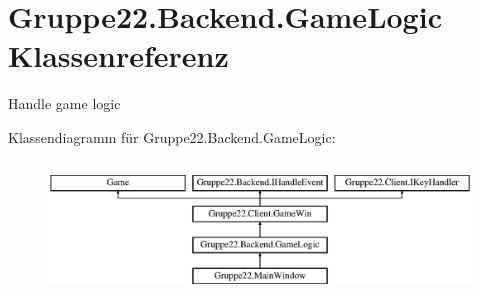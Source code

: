 \hypertarget{class_gruppe22_1_1_backend_1_1_game_logic}{\section{Gruppe22.\-Backend.\-Game\-Logic Klassenreferenz}
\label{class_gruppe22_1_1_backend_1_1_game_logic}
}


Handle game logic  


Klassendiagramm für Gruppe22.\-Backend.\-Game\-Logic\-:\begin{figure}[H]
\begin{center}
\leavevmode
\includegraphics[height=3.589744cm]{class_gruppe22_1_1_backend_1_1_game_logic}
\end{center}
\end{figure}
